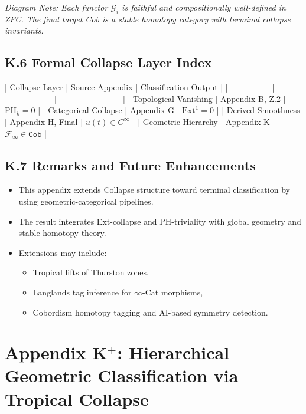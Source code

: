 \documentclass[11pt]{article}
\begin{document}
\begin{axiom}
\begin{axiom}
\textit{Diagram Note: Each functor \( \mathcal{G}_i \) is faithful and compositionally well-defined in ZFC.  
The final target Cob is a stable homotopy category with terminal collapse invariants.}

\subsection*{K.6 Formal Collapse Layer Index}

| Collapse Layer | Source Appendix | Classification Output |
|----------------|------------------|------------------------|
| Topological Vanishing | Appendix B, Z.2 | \( \mathrm{PH}_k = 0 \) |
| Categorical Collapse | Appendix G | \( \mathrm{Ext}^1 = 0 \) |
| Derived Smoothness | Appendix H, Final | \( u(t) \in C^\infty \) |
| Geometric Hierarchy | Appendix K | \( \mathcal{F}_\infty \in \texttt{Cob} \) |

\subsection*{K.7 Remarks and Future Enhancements}

\begin{itemize}
  \item This appendix extends Collapse structure toward terminal classification by using geometric-categorical pipelines.
  \item The result integrates Ext-collapse and PH-triviality with global geometry and stable homotopy theory.
  \item Extensions may include:
  \begin{itemize}
    \item Tropical lifts of Thurston zones,
    \item Langlands tag inference for \( \infty \)-Cat morphisms,
    \item Cobordism homotopy tagging and AI-based symmetry detection.
  \end{itemize}
\end{itemize}


\section*{Appendix K$^+$: Hierarchical Geometric Classification via Tropical Collapse}


\end{axiom}
\end{axiom}
\end{document}

